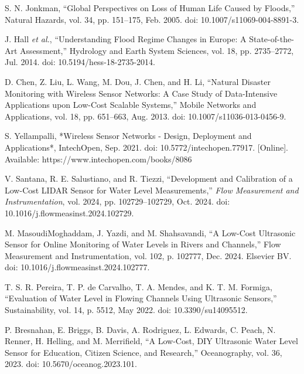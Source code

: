 \newpage
\begin{thebibliography}{00}

 S. N. Jonkman, 
``Global Perspectives on Loss of Human Life Caused by Floods,'' 
Natural Hazards, vol. 34, pp. 151--175, Feb. 2005. doi: 10.1007/s11069-004-8891-3.

 J. Hall \textit{et al.}, 
``Understanding Flood Regime Changes in Europe: A State-of-the-Art Assessment,'' 
Hydrology and Earth System Sciences, vol. 18, pp. 2735--2772, Jul. 2014. doi: 10.5194/hess-18-2735-2014.

 D. Chen, Z. Liu, L. Wang, M. Dou, J. Chen, and H. Li, 
``Natural Disaster Monitoring with Wireless Sensor Networks: A Case Study of Data-Intensive Applications upon Low-Cost Scalable Systems,'' 
Mobile Networks and Applications, vol. 18, pp. 651--663, Aug. 2013. doi: 10.1007/s11036-013-0456-9.

 S. Yellampalli, 
*Wireless Sensor Networks - Design, Deployment and Applications*, IntechOpen, Sep. 2021. doi: 10.5772/intechopen.77917. [Online]. Available: https://www.intechopen.com/books/8086

 V. Santana, R. E. Salustiano, and R. Tiezzi, ``Development and Calibration of a Low-Cost LIDAR Sensor for Water Level Measurements,'' \emph{Flow Measurement and Instrumentation}, vol. 2024, pp. 102729--102729, Oct. 2024. doi: 10.1016/j.flowmeasinst.2024.102729.

 M. MasoudiMoghaddam, J. Yazdi, and M. Shahsavandi, 
``A Low-Cost Ultrasonic Sensor for Online Monitoring of Water Levels in Rivers and Channels,'' 
Flow Measurement and Instrumentation, vol. 102, p. 102777, Dec. 2024. Elsevier BV. doi: 10.1016/j.flowmeasinst.2024.102777.

 T. S. R. Pereira, T. P. de Carvalho, T. A. Mendes, and K. T. M. Formiga, 
``Evaluation of Water Level in Flowing Channels Using Ultrasonic Sensors,'' 
Sustainability, vol. 14, p. 5512, May 2022. doi: 10.3390/su14095512.

 P. Bresnahan, E. Briggs, B. Davis, A. Rodriguez, L. Edwards, C. Peach, N. Renner, H. Helling, and M. Merrifield, 
``A Low-Cost, DIY Ultrasonic Water Level Sensor for Education, Citizen Science, and Research,'' 
Oceanography, vol. 36, 2023. doi: 10.5670/oceanog.2023.101.


\end{thebibliography}
